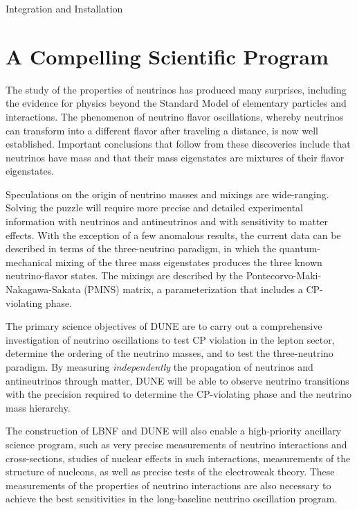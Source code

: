 Integration and Installation

\section{A Compelling Scientific Program}

The study of the properties of neutrinos has produced %
many surprises, including the evidence for physics beyond the Standard Model of elementary particles and interactions.   The phenomenon of neutrino flavor oscillations, whereby 
neutrinos can transform into a different flavor after traveling a distance, %
is now well established. Important conclusions that follow from these discoveries include that neutrinos have mass and that their %
mass eigenstates are mixtures of their %
flavor eigenstates.

Speculations on the origin of neutrino masses and mixings are wide-ranging. 
Solving the puzzle will require more precise and detailed experimental information with neutrinos and antineutrinos and with sensitivity to matter effects. With the exception of a few anomalous results, the current data can be described in terms of the three-neutrino paradigm, in which the 
quantum-mechanical mixing of the three mass eigenstates produces the three known neutrino-flavor states.  The mixings are described by the Pontecorvo-Maki-Nakagawa-Sakata (PMNS) matrix, a parameterization that includes a CP-violating phase. 

The primary science objectives %
of DUNE are to carry out a comprehensive investigation of neutrino oscillations to test CP violation in the lepton sector, determine the ordering of the neutrino masses, and to test the three-neutrino paradigm.
By measuring \textit{independently} the  propagation of neutrinos and antineutrinos through matter, DUNE will be able to observe %
neutrino transitions with the precision required to determine the 
CP-violating phase and %
the neutrino mass hierarchy.

The construction of LBNF and DUNE will also enable a high-priority ancillary science program, such as 
very precise measurements of neutrino interactions and cross-sections, studies of nuclear effects in such interactions, measurements of the structure of nucleons, as well as precise tests of the electroweak theory. 
These measurements of the properties of neutrino interactions are also necessary 
to achieve the best sensitivities in the long-baseline neutrino oscillation program. %


